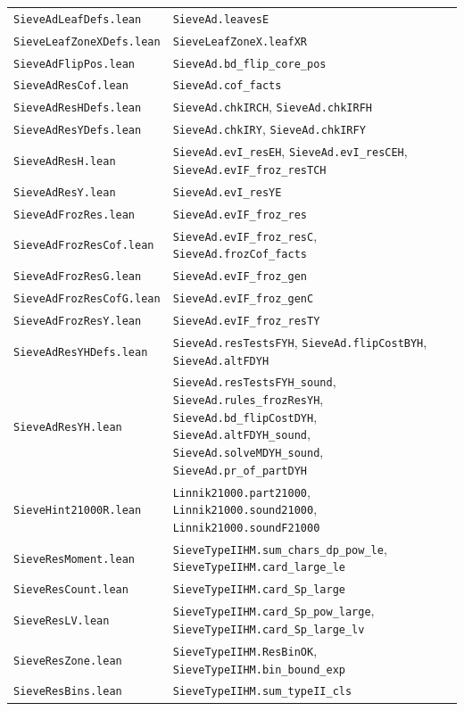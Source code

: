 \documentclass[11pt]{article}
\theoremstyle{definition}
\newcommand{\lean}[1]{\texttt{#1}}
\newcommand{\file}[1]{\nolinkurl{#1}}
\begin{document}
{\begin{longtable}{@{}l>{\raggedright\arraybackslash}p{}@{}}
\file{SieveAdLeafDefs.lean} & \lean{SieveAd.leavesE} \\
\file{SieveLeafZoneXDefs.lean} & \lean{SieveLeafZoneX.leafXR} \\
\file{SieveAdFlipPos.lean} & \lean{SieveAd.bd\_flip\_core\_pos} \\
\file{SieveAdResCof.lean} & \lean{SieveAd.cof\_facts} \\
\file{SieveAdResHDefs.lean} & \lean{SieveAd.chkIRCH}, \lean{SieveAd.chkIRFH} \\
\file{SieveAdResYDefs.lean} & \lean{SieveAd.chkIRY}, \lean{SieveAd.chkIRFY} \\
\file{SieveAdResH.lean} & \lean{SieveAd.evI\_resEH}, \lean{SieveAd.evI\_resCEH}, \lean{SieveAd.evIF\_froz\_resTCH} \\
\file{SieveAdResY.lean} & \lean{SieveAd.evI\_resYE} \\
\file{SieveAdFrozRes.lean} & \lean{SieveAd.evIF\_froz\_res} \\
\file{SieveAdFrozResCof.lean} & \lean{SieveAd.evIF\_froz\_resC}, \lean{SieveAd.frozCof\_facts} \\
\file{SieveAdFrozResG.lean} & \lean{SieveAd.evIF\_froz\_gen} \\
\file{SieveAdFrozResCofG.lean} & \lean{SieveAd.evIF\_froz\_genC} \\
\file{SieveAdFrozResY.lean} & \lean{SieveAd.evIF\_froz\_resTY} \\
\file{SieveAdResYHDefs.lean} & \lean{SieveAd.resTestsFYH}, \lean{SieveAd.flipCostBYH}, \lean{SieveAd.altFDYH} \\
\file{SieveAdResYH.lean} & \lean{SieveAd.resTestsFYH\_sound}, \lean{SieveAd.rules\_frozResYH},
\lean{SieveAd.bd\_flipCostDYH}, \lean{SieveAd.altFDYH\_sound}, \lean{SieveAd.solveMDYH\_sound},
\lean{SieveAd.pr\_of\_partDYH} \\
\file{SieveHint21000R.lean} & \lean{Linnik21000.part21000}, \lean{Linnik21000.sound21000},
\lean{Linnik21000.soundF21000} \\
\file{SieveResMoment.lean} & \lean{SieveTypeIIHM.sum\_chars\_dp\_pow\_le}, \lean{SieveTypeIIHM.card\_large\_le} \\
\file{SieveResCount.lean} & \lean{SieveTypeIIHM.card\_Sp\_large} \\
\file{SieveResLV.lean} & \lean{SieveTypeIIHM.card\_Sp\_pow\_large}, \lean{SieveTypeIIHM.card\_Sp\_large\_lv} \\
\file{SieveResZone.lean} & \lean{SieveTypeIIHM.ResBinOK}, \lean{SieveTypeIIHM.bin\_bound\_exp} \\
\file{SieveResBins.lean} & \lean{SieveTypeIIHM.sum\_typeII\_cls} \\

\end{longtable}}
\end{document}
